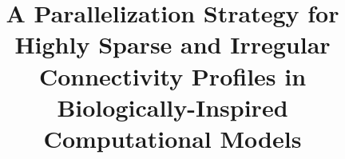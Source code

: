 \documentclass[10pt,journal,compsoc]{IEEEtran}
\begin{document}
%
\title{A Parallelization Strategy for Highly Sparse and Irregular Connectivity Profiles in Biologically-Inspired Computational Models}
%
%
%
%
\end{document}
